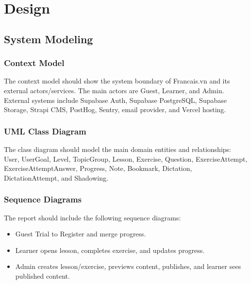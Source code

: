 \section{Design}

\subsection{System Modeling}

\subsubsection{Context Model}

The context model should show the system boundary of Francais.vn and its external actors/services. The main actors are Guest, Learner, and Admin. External systems include Supabase Auth, Supabase PostgreSQL, Supabase Storage, Strapi CMS, PostHog, Sentry, email provider, and Vercel hosting.


\subsubsection{UML Class Diagram}

The class diagram should model the main domain entities and relationships: User, UserGoal, Level, TopicGroup, Lesson, Exercise, Question, ExerciseAttempt, ExerciseAttemptAnswer, Progress, Note, Bookmark, Dictation, DictationAttempt, and Shadowing.


\subsubsection{Sequence Diagrams}

The report should include the following sequence diagrams:

\begin{itemize}[leftmargin=*]
  \item Guest Trial to Register and merge progress.
  \item Learner opens lesson, completes exercise, and updates progress.
  \item Admin creates lesson/exercise, previews content, publishes, and learner sees published content.
\end{itemize}

